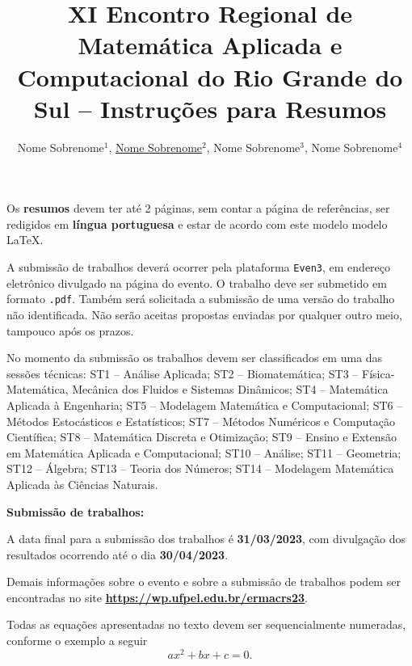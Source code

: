 \documentclass{ermacrs2023}
\title{XI Encontro Regional de Matemática Aplicada e Computacional do Rio Grande do Sul -- Instruções para Resumos}
\author{Nome Sobrenome$^{1}$, \underline{Nome Sobrenome}$^{2}$, Nome Sobrenome$^{3}$, Nome Sobrenome$^{4}$}
\begin{document}
  \maketitle
  
  Os \textbf{resumos} devem ter até 2 páginas, sem contar a página de referências, ser redigidos em \textbf{língua portuguesa} e estar de acordo com este modelo modelo \LaTeX.
  
  A submissão de trabalhos deverá ocorrer pela plataforma \texttt{Even3}, em endereço eletrônico divulgado na página do evento. O trabalho deve ser submetido em formato \texttt{.pdf}. Também será solicitada a submissão de uma versão do trabalho não identificada. Não serão aceitas propostas enviadas por qualquer outro meio, tampouco após os prazos.

  No momento da submissão os trabalhos devem ser classificados em uma das sessões técnicas: ST1 – Análise Aplicada; ST2 – Biomatemática; ST3 – Física-Matemática, Mecânica dos Fluidos e Sistemas Dinâmicos; ST4 – Matemática Aplicada à Engenharia; ST5 – Modelagem Matemática e Computacional; ST6 – Métodos Estocásticos e Estatísticos; ST7 – Métodos Numéricos e Computação Científica; ST8 – Matemática Discreta e Otimização; ST9 – Ensino e Extensão em Matemática Aplicada e Computacional; ST10 – Análise; ST11 – Geometria; ST12 – Álgebra; ST13 – Teoria dos Números; ST14 – Modelagem Matemática Aplicada às Ciências Naturais.

  \vspace{0.5cm}
  {\bf Submissão de trabalhos:}

  A data final para a submissão dos trabalhos é \textbf{31/03/2023}, com divulgação dos resultados ocorrendo até o dia \textbf{30/04/2023}.
  
  Demais informações sobre o evento e sobre a submissão de trabalhos podem ser encontradas no site \href{https://wp.ufpel.edu.br/ermacrs23}{\textbf{\underline{https://wp.ufpel.edu.br/ermacrs23}}}. 
  
  Todas as equações apresentadas no texto devem ser sequencialmente numeradas, conforme o exemplo a seguir
  \begin{equation}\label{eq:equacao-quadratica}
    ax^{2} + bx + c = 0.
  \end{equation}
 
\end{document}

